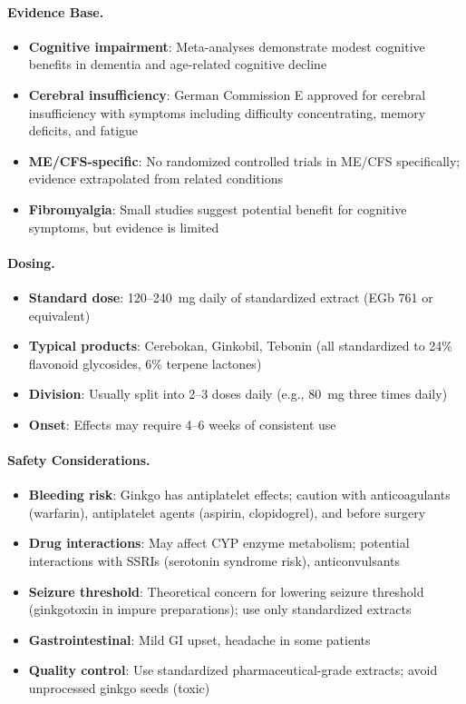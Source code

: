 \paragraph{Evidence Base.}
\begin{itemize}
    \item \textbf{Cognitive impairment}: Meta-analyses demonstrate modest cognitive benefits in dementia and age-related cognitive decline~\cite{Gauthier2014GinkgoCognition,Yuan2017GinkgoMeta}
    \item \textbf{Cerebral insufficiency}: German Commission E approved for cerebral insufficiency with symptoms including difficulty concentrating, memory deficits, and fatigue~\cite{CommissionEGinkgo1994}
    \item \textbf{ME/CFS-specific}: No randomized controlled trials in ME/CFS specifically; evidence extrapolated from related conditions
    \item \textbf{Fibromyalgia}: Small studies suggest potential benefit for cognitive symptoms, but evidence is limited
\end{itemize}

\paragraph{Dosing.}
\begin{itemize}
    \item \textbf{Standard dose}: 120--240~mg daily of standardized extract (EGb 761 or equivalent)
    \item \textbf{Typical products}: Cerebokan, Ginkobil, Tebonin (all standardized to 24\% flavonoid glycosides, 6\% terpene lactones)
    \item \textbf{Division}: Usually split into 2--3 doses daily (e.g., 80~mg three times daily)
    \item \textbf{Onset}: Effects may require 4--6 weeks of consistent use
\end{itemize}

\paragraph{Safety Considerations.}
\begin{itemize}
    \item \textbf{Bleeding risk}: Ginkgo has antiplatelet effects; caution with anticoagulants (warfarin), antiplatelet agents (aspirin, clopidogrel), and before surgery
    \item \textbf{Drug interactions}: May affect CYP enzyme metabolism; potential interactions with SSRIs (serotonin syndrome risk), anticonvulsants
    \item \textbf{Seizure threshold}: Theoretical concern for lowering seizure threshold (ginkgotoxin in impure preparations); use only standardized extracts
    \item \textbf{Gastrointestinal}: Mild GI upset, headache in some patients
    \item \textbf{Quality control}: Use standardized pharmaceutical-grade extracts; avoid unprocessed ginkgo seeds (toxic)
\end{itemize}

